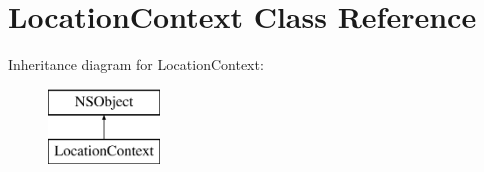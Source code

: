 \hypertarget{interface_location_context}{
\section{\-Location\-Context \-Class \-Reference}
\label{interface_location_context}
}
\-Inheritance diagram for \-Location\-Context\-:\begin{figure}[H]
\begin{center}
\leavevmode
\includegraphics[height=2.000000cm]{interface_location_context}
\end{center}
\end{figure}
